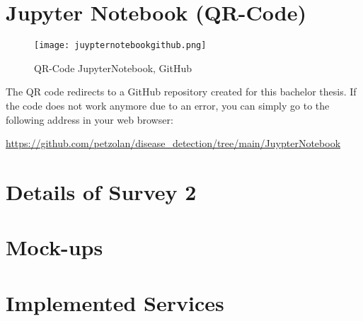 \pagebreak
\chapter{Jupyter Notebook (QR-Code)}
\begin{figure}[H]
	\centering
	\texttt{[image: juypternotebookgithub.png]}
	\caption{QR-Code JupyterNotebook, GitHub}
\end{figure}
The QR code redirects to a GitHub repository created for this bachelor thesis. If the code does not work anymore due to an error, you can simply go to the following address in your web browser:
\begin{center}
	\url{https://github.com/petzolan/disease_detection/tree/main/JuypterNotebook}
\end{center}



\chapter{Details of Survey 2}




\chapter{Mock-ups}




\chapter{Implemented Services}
